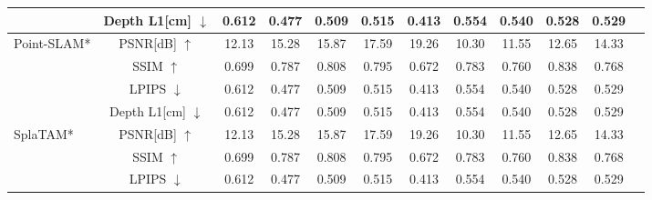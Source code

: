 \documentclass{article}
\begin{document}
\begin{table}[t]
\begin{tabular}{l|c|cccccccccc}
    & Depth L1[cm] $\downarrow$  & 0.612       & 0.477        & 0.509        & 0.515        
                             & 0.413       & 0.554        & 0.540        & 0.528        & 0.529    \\

\midrule

\multirow{4}{*}{Point-SLAM* \cite{}}                          
    & PSNR[dB] $\uparrow$    & 12.13       & 15.28        & 15.87        & 17.59        
                             & 19.26       & 10.30        & 11.55        & 12.65        & 14.33    \\
                                                                     
    & SSIM $\uparrow$        & 0.699       & 0.787        & 0.808        & 0.795        
                             & 0.672       & 0.783        & 0.760        & 0.838        & 0.768    \\
                                                                     
    & LPIPS $\downarrow$     & 0.612       & 0.477        & 0.509        & 0.515        
                             & 0.413       & 0.554        & 0.540        & 0.528        & 0.529    \\
                             
    & Depth L1[cm] $\downarrow$  & 0.612       & 0.477        & 0.509        & 0.515        
                             & 0.413       & 0.554        & 0.540        & 0.528        & 0.529    \\

\midrule

\multirow{4}{*}{SplaTAM* \cite{}}                          
    & PSNR[dB] $\uparrow$    & 12.13       & 15.28        & 15.87        & 17.59        
                             & 19.26       & 10.30        & 11.55        & 12.65        & 14.33    \\
                                                                     
    & SSIM $\uparrow$        & 0.699       & 0.787        & 0.808        & 0.795        
                             & 0.672       & 0.783        & 0.760        & 0.838        & 0.768    \\
                                                                     
    & LPIPS $\downarrow$     & 0.612       & 0.477        & 0.509        & 0.515        
                             & \cellcolor{tabsecond}0.413       & 0.554        & 0.540        & 0.528        & 0.529    \\


\end{tabular}
\end{table}
\end{document}
